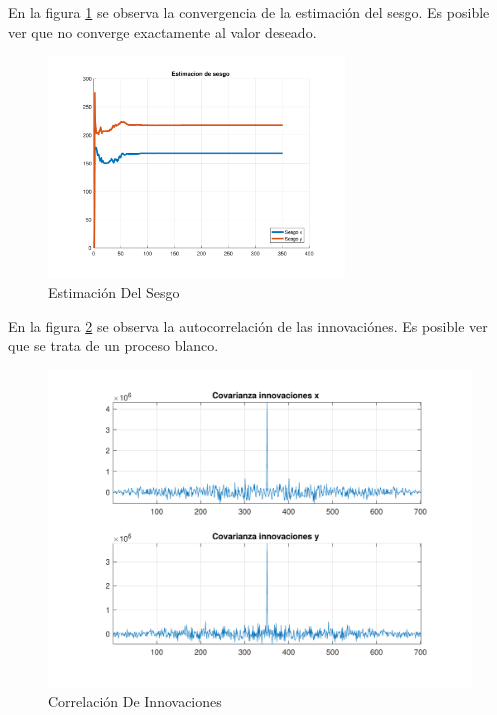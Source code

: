 	En la figura \ref{fig:ej4a_bias} se observa la convergencia de la estimación del sesgo. Es posible ver que no converge exactamente al valor deseado.
	
	\begin{figure}[H]
		\centering
		\includegraphics[width=0.7\textwidth,keepaspectratio]{Figuras/bias_ej4a.pdf}
		\caption{Estimación Del Sesgo}
		\label{fig:ej4a_bias}
	\end{figure}
	
	En la figura \ref{fig:ej4a_cov} se observa la autocorrelación de las innovaciónes. Es posible ver que se trata de un proceso blanco.
	
	\begin{figure}[H]
		\centering
		\includegraphics[width=1.0\textwidth,keepaspectratio]{Figuras/covinn_ej4a.pdf}
		\caption{Correlación De Innovaciones}
		\label{fig:ej4a_cov}
	\end{figure}
	

